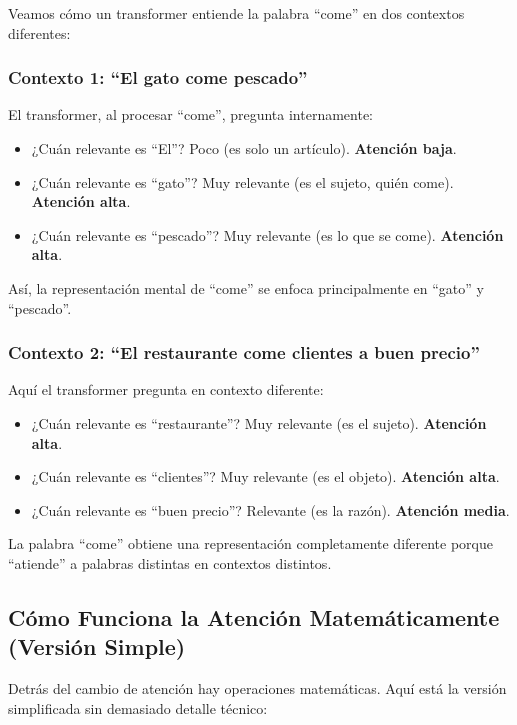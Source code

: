 \documentclass[11pt,a4paper]{article}
\begin{document}
Veamos cómo un transformer entiende la palabra ``come'' en dos contextos diferentes:

\subsubsection{Contexto 1: ``El gato come pescado''}

El transformer, al procesar ``come'', pregunta internamente:
\begin{itemize}[leftmargin=*]
    \item ¿Cuán relevante es ``El''? Poco (es solo un artículo). \textbf{Atención baja}.
    \item ¿Cuán relevante es ``gato''? Muy relevante (es el sujeto, quién come). \textbf{Atención alta}.
    \item ¿Cuán relevante es ``pescado''? Muy relevante (es lo que se come). \textbf{Atención alta}.
\end{itemize}

Así, la representación mental de ``come'' se enfoca principalmente en ``gato'' y ``pescado''.

\subsubsection{Contexto 2: ``El restaurante come clientes a buen precio''}

Aquí el transformer pregunta en contexto diferente:
\begin{itemize}[leftmargin=*]
    \item ¿Cuán relevante es ``restaurante''? Muy relevante (es el sujeto). \textbf{Atención alta}.
    \item ¿Cuán relevante es ``clientes''? Muy relevante (es el objeto). \textbf{Atención alta}.
    \item ¿Cuán relevante es ``buen precio''? Relevante (es la razón). \textbf{Atención media}.
\end{itemize}

La palabra ``come'' obtiene una representación completamente diferente porque ``atiende'' a palabras distintas en contextos distintos.

\subsection{Cómo Funciona la Atención Matemáticamente (Versión Simple)}

Detrás del cambio de atención hay operaciones matemáticas. Aquí está la versión simplificada sin demasiado detalle técnico:
\end{document}
